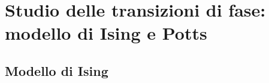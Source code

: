 






\section{Studio delle transizioni di fase: modello di Ising e Potts}
\subsection{Modello di Ising}



